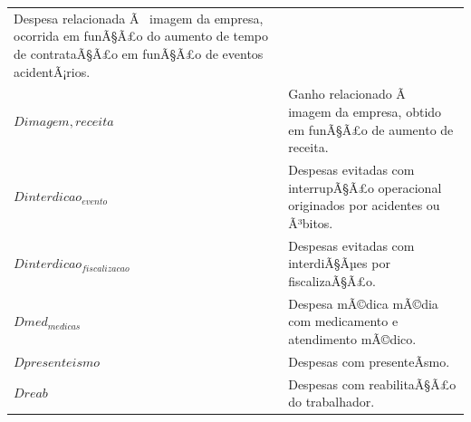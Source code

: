 \documentclass[]{article}
\begin{document}
\begin{longtable}[]{@{}ll@{}}
\begin{minipage}[t]{0.87\columnwidth}
Despesa relacionada Ã~ imagem da empresa, ocorrida em funÃ§Ã£o do
aumento de tempo de contrataÃ§Ã£o em funÃ§Ã£o de eventos
acidentÃ¡rios.\strut
\end{minipage}\tabularnewline
\begin{minipage}[t]{0.07\columnwidth}\raggedright\strut
\(Dimagem, receita\)\strut
\end{minipage} & \begin{minipage}[t]{0.87\columnwidth}\raggedright\strut
Ganho relacionado Ã~ imagem da empresa, obtido em funÃ§Ã£o de aumento de
receita.\strut
\end{minipage}\tabularnewline
\begin{minipage}[t]{0.07\columnwidth}\raggedright\strut
\(Dinterdicao_{evento}\)\strut
\end{minipage} & \begin{minipage}[t]{0.87\columnwidth}\raggedright\strut
Despesas evitadas com interrupÃ§Ã£o operacional originados por acidentes
ou Ã³bitos.\strut
\end{minipage}\tabularnewline
\begin{minipage}[t]{0.07\columnwidth}\raggedright\strut
\(Dinterdicao_{fiscalizacao}\)\strut
\end{minipage} & \begin{minipage}[t]{0.87\columnwidth}\raggedright\strut
Despesas evitadas com interdiÃ§Ãµes por fiscalizaÃ§Ã£o.\strut
\end{minipage}\tabularnewline
\begin{minipage}[t]{0.07\columnwidth}\raggedright\strut
\(Dmed_{medicas}\)\strut
\end{minipage} & \begin{minipage}[t]{0.87\columnwidth}\raggedright\strut
Despesa mÃ©dica mÃ©dia com medicamento e atendimento mÃ©dico.\strut
\end{minipage}\tabularnewline
\begin{minipage}[t]{0.07\columnwidth}\raggedright\strut
\(Dpresenteismo\)\strut
\end{minipage} & \begin{minipage}[t]{0.87\columnwidth}\raggedright\strut
Despesas com presenteÃ­smo.\strut
\end{minipage}\tabularnewline
\begin{minipage}[t]{0.07\columnwidth}\raggedright\strut
\(Dreab\)\strut
\end{minipage} & \begin{minipage}[t]{0.87\columnwidth}\raggedright\strut
Despesas com reabilitaÃ§Ã£o do trabalhador.\strut

\end{minipage}
\end{longtable}
\end{document}
